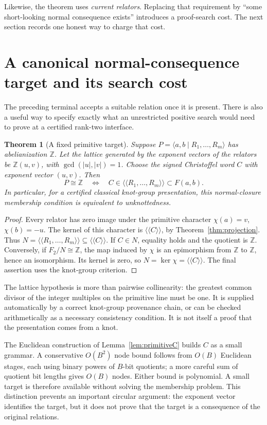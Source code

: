 \documentclass[11pt,letterpaper]{article}
\newtheorem{theorem}{Theorem}[section]
\theoremstyle{definition}
\newcommand{\Z}{\mathbb Z}
\newcommand{\nc}[1]{\langle\!\langle #1\rangle\!\rangle}
\begin{document}
Likewise, the theorem uses \emph{current relators}. Replacing that requirement
by ``some short-looking normal consequence exists'' introduces a proof-search
cost. The next section records one honest way to charge that cost.

\section{A canonical normal-consequence target and its search cost}
\label{sec:consequences}
The preceding terminal accepts a suitable relation once it is present. There
is also a useful way to specify exactly what an unrestricted positive search
would need to prove at a certified rank-two interface.

\begin{theorem}[A fixed primitive target]
\label{thm:target}
Suppose $P=\langle a,b\mid R_1,\ldots,R_m\rangle$ has abelianization $\Z$.
Let the lattice generated by the exponent vectors of the relators be
$\Z(u,v)$, with $\gcd(|u|,|v|)=1$. Choose the signed Christoffel word $C$
with exponent vector $(u,v)$. Then
\[
 P\cong\Z\quad\Longleftrightarrow\quad
 C\in\nc{R_1,\ldots,R_m}\subset F(a,b).
\]
In particular, for a certified classical knot-group presentation, this
normal-closure membership condition is equivalent to unknottedness.
\end{theorem}
\begin{proof}
Every relator has zero image under the primitive character
$\chi(a)=v$, $\chi(b)=-u$. The kernel of this character is $\nc{C}$, by
Theorem~\ref{thm:projection}. Thus $N=\nc{R_1,\ldots,R_m}\subseteq\nc{C}$.
If $C\in N$, equality holds and the quotient is $\Z$. Conversely, if
$F_2/N\cong\Z$, the map induced by $\chi$ is an epimorphism from $\Z$ to
$\Z$, hence an isomorphism. Its kernel is zero, so $N=\ker\chi=\nc{C}$.
The final assertion uses the knot-group criterion.
\end{proof}

The lattice hypothesis is more than pairwise collinearity: the greatest
common divisor of the integer multiples on the primitive line must be one.
It is supplied automatically by a correct knot-group provenance chain, or
can be checked arithmetically as a necessary consistency condition. It is
not itself a proof that the presentation comes from a knot.

The Euclidean construction of Lemma~\ref{lem:primitiveC} builds $C$ as a
small grammar. A conservative $O(B^2)$ node bound follows from $O(B)$
Euclidean stages, each using binary powers of $B$-bit quotients; a more
careful sum of quotient bit lengths gives $O(B)$ nodes. Either bound is
polynomial. A small target is therefore available without solving the
membership problem. This distinction prevents an important circular
argument: the exponent vector identifies the target, but it does not prove
that the target is a consequence of the original relations.
\end{document}
